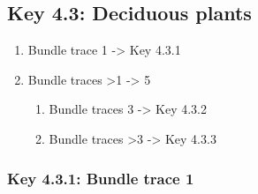 \documentclass[openany]{book}
\providecommand{\tightlist}{%
  \setlength{\itemsep}{0pt}\setlength{\parskip}{0pt}}
\begin{document}
\hypertarget{key-4.3-deciduous-plants-1}{%
\subsection{Key 4.3: Deciduous
plants}\label{key-4.3-deciduous-plants-1}}

\begin{enumerate}
\def\labelenumi{\arabic{enumi}.}
\tightlist
\item
  Bundle trace 1 -\textgreater{} Key 4.3.1
\item
  Bundle traces \textgreater{}1 -\textgreater{} 5

  \begin{enumerate}
  \def\labelenumii{\arabic{enumii}.}
  \setcounter{enumii}{2}
  \tightlist
  \item
    Bundle traces 3 -\textgreater{} Key 4.3.2
  \item
    Bundle traces \textgreater{}3 -\textgreater{} Key 4.3.3
  \end{enumerate}
\end{enumerate}

\hypertarget{key-4.3.1-bundle-trace-1-1}{%
\subsubsection{Key 4.3.1: Bundle trace
1}\label{key-4.3.1-bundle-trace-1-1}}
\end{document}
